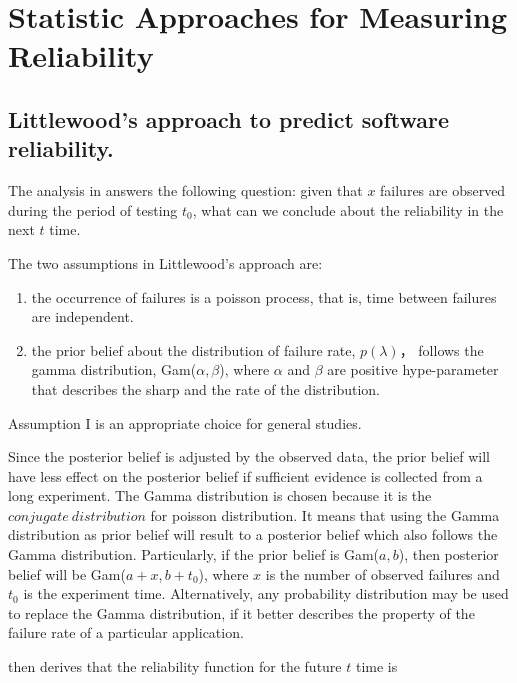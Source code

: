 \documentclass[12pt, authoryear]{article}
\begin{document}
\section{Statistic Approaches for Measuring Reliability}\label{statistic}

\subsection{Littlewood's approach to predict software 
reliability.}\label{littlewood}

The analysis in \citep{Littlewood93} answers the following question: given 
that $x$ failures are observed during the period of testing $t_0$,  what can we 
conclude about the reliability in the next $t$ time.
  
The two assumptions in Littlewood's approach are:

\begin{enumerate}[{Assumption} I)]
  \item the occurrence of failures is a poisson process, that is, time 
between failures are independent.
  \item the prior belief about the distribution of failure rate, $p(\lambda)$， 
follows the gamma distribution, Gam($\alpha, \beta$), where $\alpha$ and 
$\beta$ are positive hype-parameter that describes the sharp and the rate of 
the distribution.
\end{enumerate}

Assumption I is an appropriate choice for general studies.

Since the posterior belief is adjusted by the observed data, the prior belief 
will have less effect on the posterior belief if sufficient evidence is 
collected from a long experiment.  The Gamma distribution is chosen because it 
is the $conjugate\ distribution$ for poisson distribution.  It means 
that using the Gamma distribution as prior belief will result to a posterior 
belief which also follows the Gamma distribution.  Particularly, if the prior 
belief is Gam($a, b$), then posterior belief will be Gam($a+x, b+t_0$), where 
$x$ is the number of observed failures and $t_0$ is the experiment time. 
\citeauthor{Littlewood93}   Alternatively, any probability distribution may be 
used to replace the Gamma distribution, if it better describes the property of 
the failure rate of a particular application.  



\citeauthor{Littlewood93} then derives that the reliability function for the 
future $t$ time is
\end{document}
